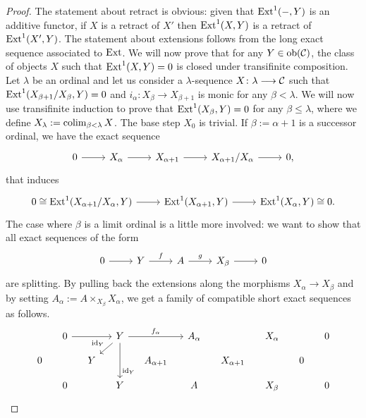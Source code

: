 \begin{proof}
	The statement about retract is obvious: given that $\mathrm{Ext}^1({-},Y)$ is an additive functor, if $X$ is a retract of $X'$ then $\mathrm{Ext}^1(X,Y)$ is a retract of $\mathrm{Ext}^1(X',Y)$. The statement about extensions follows from the long exact sequence associated to $\mathrm{Ext}$.
	We will now prove that for any $Y \in \mathrm{ob}(\mathcal{C})$, the class of objects $X$ such that $\mathrm{Ext}^1(X,Y)=0$ is closed under transifinite composition. Let $\lambda$ be an ordinal and let us consider a $\lambda$-sequence $X\colon \lambda \longrightarrow \mathcal{C}$ such that $\mathrm{Ext}^1(X_{\beta +1} / X_\beta,Y) = 0$ and $i_\alpha \colon X_\beta \longrightarrow X_ {\beta+1}$ is monic for any $\beta < \lambda$. We will now use transifinite induction to prove that $\mathrm{Ext}^1(X_\beta, Y) = 0$ for any $\beta \leq \lambda$, where we define $X_\lambda := \colim_{\beta < \lambda} X$. The base step $X_0$ is trivial. If $\beta := \alpha+1$ is a successor ordinal, we  have the exact sequence
	\[\begin{tikzcd}
		0 & {X_\alpha} & {X_{\alpha +1}} & {X_{\alpha+1}/ X_\alpha} & {0,}
		\arrow[from=1-1, to=1-2]
		\arrow[from=1-2, to=1-3]
		\arrow[from=1-3, to=1-4]
		\arrow[from=1-4, to=1-5]
	\end{tikzcd}\]
	that induces
	\[\begin{tikzcd}
		{0 \cong\Ext^1(X_{\alpha+1}/ X_\alpha, Y)} & {\Ext^1(X_{\alpha +1}, Y)} & {\Ext^1( X_\alpha, Y) \cong 0.}
		\arrow[from=1-1, to=1-2]
		\arrow[from=1-2, to=1-3]
	\end{tikzcd}\]
	The case where $\beta$ is a limit ordinal is a little more involved: we want to show that all exact sequences of the form
	\[\begin{tikzcd}
		0 & Y & A & {X_\beta} & 0
		\arrow[from=1-1, to=1-2]
		\arrow["f", from=1-2, to=1-3]
		\arrow["g", from=1-3, to=1-4]
		\arrow[from=1-4, to=1-5]
	\end{tikzcd}\]
	are splitting. By pulling back the extensions along the morphisms $X_\alpha \longrightarrow X_\beta $ and by setting $A_\alpha := A \times_{X_\beta} X_\alpha$, we get a family of compatible short exact sequences as follows.
	\[\begin{tikzcd}[sep=small]
		& 0 && Y && {A_\alpha} && {X_\alpha} && 0 \\
		0 && Y && {A_{\alpha+1}} && {X_{\alpha+1}} && 0 \\
		& 0 && Y && A && {X_\beta} && 0
		\arrow[from=1-2, to=1-4]
		\arrow["{{f_\alpha}}", from=1-4, to=1-6]
		\arrow["{\id_Y}"', from=1-4, to=2-3]
		\arrow["{\id_Y}"{pos=0.8}, from=1-4, to=3-4]

\end{tikzcd}\]
\end{proof}
